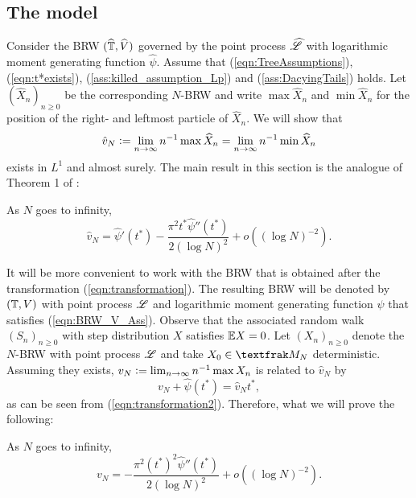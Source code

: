 \subsection{The model}\label{subsec:The_model}
Consider the BRW $(\widehat{\mathbb{T}}, \widehat{V})$ governed by the point process $\widehat{\mathscr{L}}$ with logarithmic moment generating function $\widehat{\psi}$. Assume that (\ref{eqn:TreeAssumptions}), (\ref{eqn:t*exists}), (\ref{ass:killed_assumption_Lp}) and (\ref{ass:DacyingTails}) holds. Let $(\widehat{X}_n)_{n \geq 0}$ be the corresponding $N$-BRW and write $\max \widehat{X}_n$ and $\min \widehat{X}_n$ for the position of the right- and leftmost particle of $\widehat{X}_n$. We will show that 
\begin{equation}\nonumber
\hat{v}_N \vcentcolon= \lim_{n \to \infty} n^{-1}\max\widehat{X}_n = \lim_{n \to \infty} n^{-1}\min\widehat{X}_n
\end{equation} 
exists in $L^1$ and almost surely. The main result in this section is the analogue of Theorem 1 of \cite{exp_tails}: 
\begin{theorem}\label{thm:ExpTails_BrunDer_non_transformed}
As $N$ goes to infinity, 
\begin{equation}\nonumber
\widehat{v}_N = \widehat{\psi}'(t^*) - \frac{\pi^2 t^* \widehat{\psi}''(t^*)}{2 (\log N)^2} + o((\log N)^{-2}). 
\end{equation}
\end{theorem}




It will be more convenient to work with the BRW that is obtained after the transformation (\ref{eqn:transformation}). The resulting BRW will be denoted by $(\mathbb{T}, V)$ with point process $\mathscr{L}$ and logarithmic moment generating function $\psi$ that satisfies (\ref{eqn:BRW_V_Ass}). Observe that the associated random walk $(S_n)_{n \geq 0}$ with step distribution $X$ satisfies $\mathbb{E} X = 0$. Let $(X_n)_{n \geq 0}$ denote the $N$-BRW with point process $\mathscr{L}$ and take $X_0 \in \frak{M}_N$ deterministic. Assuming they exists, $v_N \vcentcolon= \lim_{n \to \infty} n^{-1} \max X_n$ is related to $\hat{v}_N$ by 
\begin{equation}\label{eqn:speed_relation}
v_N + \widehat{\psi}(t^*)= \hat{v}_N t^*, 
\end{equation}
as can be seen from (\ref{eqn:transformation2}). Therefore, what we will prove the following:
\begin{theorem} \label{thm:ExpTails_BrunDer}
As $N$ goes to infinity, 
\begin{equation}\nonumber
v_N = - \frac{\pi^2 (t^*)^2 \widehat{\psi}''(t^*)} {2 (\log N)^2} + o((\log N)^{-2}). 
\end{equation}
\end{theorem}

